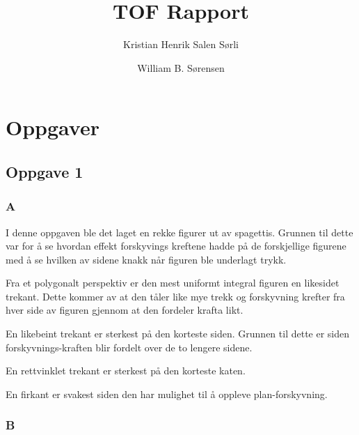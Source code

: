 \documentclass{report}
\author{
  Kristian Henrik Salen Sørli
  \and
  William B. Sørensen\\
}
\title{TOF Rapport}
\begin{document}
\maketitle

\tableofcontents

\chapter{Oppgaver}

\section*{Oppgave 1}

\subsection*{A}

I denne oppgaven ble det laget en rekke figurer ut av spagettis. Grunnen til dette var for å se hvordan effekt forskyvings kreftene hadde på de forskjellige figurene med å se hvilken av sidene knakk når figuren ble underlagt trykk.

Fra et polygonalt perspektiv er den mest uniformt integral figuren en likesidet trekant. Dette kommer av at den tåler like mye trekk og forskyvning krefter fra hver side av figuren gjennom at den fordeler krafta likt.

En likebeint trekant er sterkest på den korteste siden. Grunnen til dette er siden forskyvnings-kraften blir fordelt over de to lengere sidene.

En rettvinklet trekant er sterkest på den korteste katen.

En firkant er svakest siden den har mulighet til å oppleve plan-forskyvning.

\subsection*{B}
\end{document}

